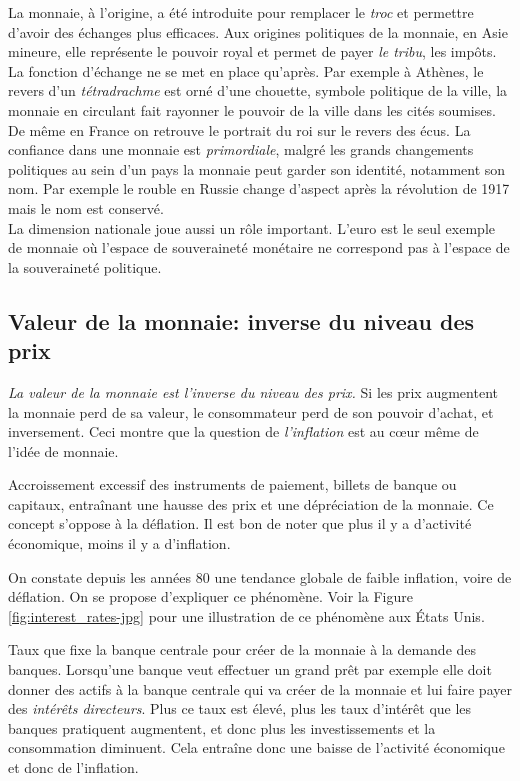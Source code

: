 \documentclass[main.tex]{subfiles}
\begin{document}
La monnaie, à l'origine, a été introduite pour remplacer le \emph{troc} et permettre d'avoir des échanges plus efficaces. Aux origines politiques de la monnaie, en Asie mineure, elle représente le pouvoir royal et permet de payer \emph{le tribu}, les impôts. La fonction d'échange ne se met en place qu'après. Par exemple à Athènes, le revers d'un \emph{tétradrachme} est orné d'une chouette, symbole politique de la ville, la monnaie en circulant fait rayonner le pouvoir de la ville dans les cités soumises. De même en France on retrouve le portrait du roi sur le revers des écus.
        La confiance dans une monnaie est \emph{primordiale}, malgré les grands changements politiques au sein d'un pays la monnaie peut garder son identité, notamment son nom. Par exemple le rouble en Russie change d'aspect après la révolution de 1917 mais le nom est conservé. \\
        La dimension nationale joue aussi un rôle important. L'euro est le seul exemple de monnaie où l'espace de souveraineté monétaire ne correspond pas à l'espace de la souveraineté politique.

        \subsection{Valeur de la monnaie: inverse du niveau des prix}
        \emph{La valeur de la monnaie est l'inverse du niveau des prix.} Si les prix augmentent la monnaie perd de sa valeur, le consommateur perd de son pouvoir d'achat, et inversement. Ceci montre que la question de \emph{l'inflation} est au cœur même de l'idée de monnaie. \\

        \begin{definition}[Inflation]
                Accroissement excessif des instruments de paiement, billets de banque ou capitaux, entraînant une hausse des prix et une dépréciation de la monnaie. Ce concept s'oppose à la déflation.
                Il est bon de noter que plus il y a d'activité économique, moins il y a d'inflation.
        \end{definition}
        On constate depuis les années 80 une tendance globale de faible inflation, voire de déflation. On se propose d'expliquer ce phénomène. Voir la Figure \ref{fig:interest_rates-jpg} pour une illustration de ce phénomène aux États Unis.

        \begin{definition}
        Taux que fixe la banque centrale pour créer de la monnaie à la demande des banques. Lorsqu'une banque veut effectuer un grand prêt par exemple elle doit donner des actifs à la banque centrale qui va créer de la monnaie et lui faire payer des \emph{intérêts directeurs}. Plus ce taux est élevé, plus les taux d'intérêt que les banques pratiquent augmentent, et donc plus les investissements et la consommation diminuent. Cela entraîne donc une baisse de l'activité économique et donc de l'inflation.
        \end{definition}
\end{document}
